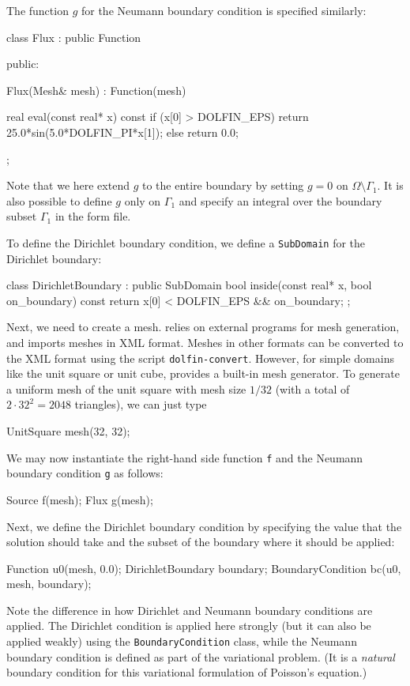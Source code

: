 The function $g$ for the Neumann boundary condition is specified
similarly:
\begin{code}
class Flux : public Function
{
public:

  Flux(Mesh& mesh) : Function(mesh) {}

  real eval(const real* x) const
  {
    if (x[0] > DOLFIN_EPS)
      return 25.0*sin(5.0*DOLFIN_PI*x[1]);
    else
      return 0.0;
  }

};
\end{code}

Note that we here extend $g$ to the entire boundary by setting $g = 0$
on $\Omega \setminus \Gamma_1$. It is also possible to define $g$ only
on $\Gamma_1$ and specify an integral over the boundary subset
$\Gamma_1$ in the form file.

To define the Dirichlet boundary condition, we define a
\texttt{SubDomain} for the Dirichlet boundary:
\begin{code}
class DirichletBoundary : public SubDomain
{
  bool inside(const real* x, bool on_boundary) const
  {
    return x[0] < DOLFIN_EPS && on_boundary;
  }
};
\end{code}

Next, we need to create a mesh. \dolfin{} relies on external programs
for mesh generation, and imports meshes in \dolfin{} XML
format. Meshes in other formats can be converted to the \dolfin{} XML
format using the script \texttt{dolfin-convert}. However, for simple
domains like the unit square or unit cube, \dolfin{} provides a
built-in mesh generator. To generate a uniform mesh of the unit square
with mesh size $1/32$ (with a total of $2\cdot 32^2 = 2048$
triangles), we can just type
\begin{code}
UnitSquare mesh(32, 32);
\end{code}

We may now instantiate the right-hand side function \texttt{f} and the
Neumann boundary condition \texttt{g} as follows:
\begin{code}
Source f(mesh);
Flux g(mesh);
\end{code}

Next, we define the Dirichlet boundary condition by specifying the
value that the solution should take and the subset of the boundary
where it should be applied:
\begin{code}
Function u0(mesh, 0.0);
DirichletBoundary boundary;
BoundaryCondition bc(u0, mesh, boundary);
\end{code}
Note the difference in how Dirichlet and Neumann boundary conditions
are applied. The Dirichlet condition is applied here strongly (but it
can also be applied weakly) using the \texttt{BoundaryCondition}
class, while the Neumann boundary condition is defined as part of the
variational problem. (It is a \emph{natural} boundary condition for
this variational formulation of Poisson's equation.)

